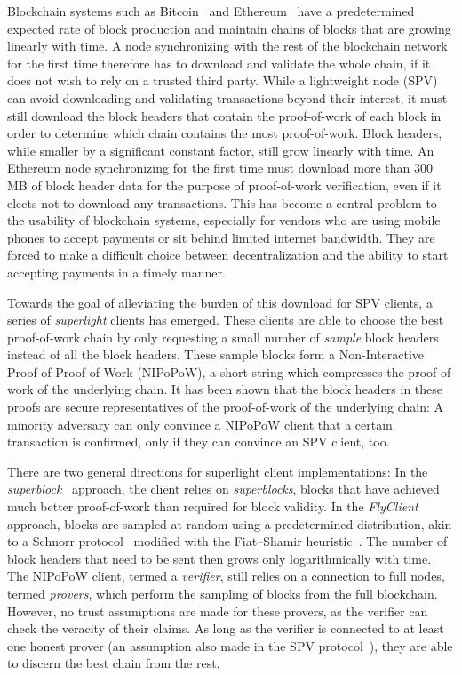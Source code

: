 Blockchain systems such as Bitcoin~\cite{nakamoto} and
Ethereum~\cite{buterin,wood} have a predetermined expected rate of block
production and maintain chains of blocks that are growing linearly
with time. A node synchronizing with the rest of the blockchain
network for the first time therefore has to download and validate the whole
chain, if it does not wish to rely on a trusted third party. While a lightweight
node (SPV) can avoid downloading and validating transactions beyond their
interest, it must still download the block headers that contain the
proof-of-work\cite{pow} of each block in order to determine which chain contains
the most proof-of-work. Block headers, while smaller by a significant constant
factor, still grow linearly with time. An Ethereum node synchronizing for the
first time must download more than $300$ MB of block header data for the purpose
of proof-of-work verification, even if it elects not to download any
transactions. This has become a central problem to the usability of blockchain
systems, especially for vendors who are using mobile phones to accept payments
or sit behind limited internet bandwidth. They are forced to make a difficult
choice between decentralization and the ability to start accepting payments in a
timely manner.

Towards the goal of alleviating the burden of this download for SPV clients, a
series of \emph{superlight} clients has emerged. These clients are able to
choose the best proof-of-work chain by only requesting a small number of
\emph{sample} block headers instead of all the block headers. These sample
blocks form a Non-Interactive Proof of Proof-of-Work (NIPoPoW), a short string
which compresses the proof-of-work of the underlying chain. It has been shown
that the block headers in these proofs are secure representatives of the
proof-of-work of the underlying chain: A minority adversary can only convince a
NIPoPoW client that a certain transaction is confirmed, only if they can
convince an SPV client, too.

There are two general directions for superlight client implementations: In the
\emph{superblock}~\cite{nipopow,compactsuperblocks} approach, the client
relies on \emph{superblocks}, blocks that have achieved much better
proof-of-work than required for block validity. In the
\emph{FlyClient}~\cite{flyclient} approach, blocks are sampled at random using a
predetermined distribution, akin to a Schnorr protocol~\cite{schnorr} modified
with the Fiat--Shamir heuristic~\cite{fiatshamir}. The number of block headers
that need to be sent then grows only logarithmically with time. The NIPoPoW
client, termed a \emph{verifier}, still relies on a connection to full nodes,
termed \emph{provers}, which perform the sampling of blocks from the full
blockchain. However, no trust assumptions are made for these provers, as the
verifier can check the veracity of their claims. As long as the verifier is
connected to at least one honest prover (an assumption also made in the SPV
protocol~\cite{eclipse,eclipse-ethereum}), they are able to discern the best chain from the rest.


